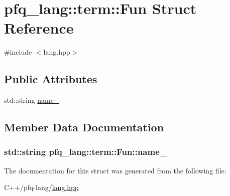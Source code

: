 \hypertarget{structpfq__lang_1_1term_1_1Fun}{\section{pfq\+\_\+lang\+:\+:term\+:\+:Fun Struct Reference}
\label{structpfq__lang_1_1term_1_1Fun}
}


{\ttfamily \#include $<$lang.\+hpp$>$}

\subsection*{Public Attributes}
\begin{DoxyCompactItemize}
\item 
std\+::string \hyperlink{structpfq__lang_1_1term_1_1Fun_a22db9b575894dc5a7e869ddf410a64b4}{name\+\_\+}
\end{DoxyCompactItemize}


\subsection{Member Data Documentation}
\hypertarget{structpfq__lang_1_1term_1_1Fun_a22db9b575894dc5a7e869ddf410a64b4}{
\subsubsection[{name\+\_\+}]{\setlength{\rightskip}{0pt plus 5cm}std\+::string pfq\+\_\+lang\+::term\+::\+Fun\+::name\+\_\+}}\label{structpfq__lang_1_1term_1_1Fun_a22db9b575894dc5a7e869ddf410a64b4}


The documentation for this struct was generated from the following file\+:\begin{DoxyCompactItemize}
\item 
C++/pfq-\/lang/\hyperlink{lang_8hpp}{lang.\+hpp}\end{DoxyCompactItemize}
